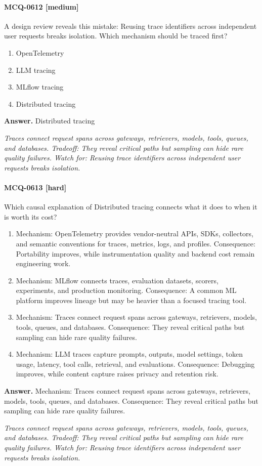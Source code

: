 \paragraph{MCQ-0612 [medium]} A design review reveals this mistake: Reusing trace identifiers across independent user requests breaks isolation. Which mechanism should be traced first?
\begin{enumerate}[label=\Alph*.]
\item OpenTelemetry
\item LLM tracing
\item MLflow tracing
\item Distributed tracing
\end{enumerate}
\noindent\textbf{Answer.} Distributed tracing
\par\textit{Traces connect request spans across gateways, retrievers, models, tools, queues, and databases. Tradeoff: They reveal critical paths but sampling can hide rare quality failures. Watch for: Reusing trace identifiers across independent user requests breaks isolation.}
\paragraph{MCQ-0613 [hard]} Which causal explanation of Distributed tracing connects what it does to when it is worth its cost?
\begin{enumerate}[label=\Alph*.]
\item Mechanism: OpenTelemetry provides vendor-neutral APIs, SDKs, collectors, and semantic conventions for traces, metrics, logs, and profiles. Consequence: Portability improves, while instrumentation quality and backend cost remain engineering work.
\item Mechanism: MLflow connects traces, evaluation datasets, scorers, experiments, and production monitoring. Consequence: A common ML platform improves lineage but may be heavier than a focused tracing tool.
\item Mechanism: Traces connect request spans across gateways, retrievers, models, tools, queues, and databases. Consequence: They reveal critical paths but sampling can hide rare quality failures.
\item Mechanism: LLM traces capture prompts, outputs, model settings, token usage, latency, tool calls, retrieval, and evaluations. Consequence: Debugging improves, while content capture raises privacy and retention risk.
\end{enumerate}
\noindent\textbf{Answer.} Mechanism: Traces connect request spans across gateways, retrievers, models, tools, queues, and databases. Consequence: They reveal critical paths but sampling can hide rare quality failures.
\par\textit{Traces connect request spans across gateways, retrievers, models, tools, queues, and databases. Tradeoff: They reveal critical paths but sampling can hide rare quality failures. Watch for: Reusing trace identifiers across independent user requests breaks isolation.}
